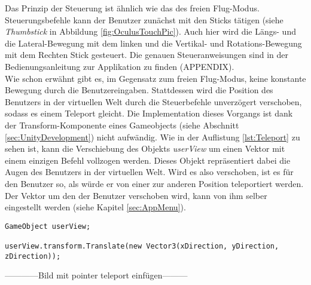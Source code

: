 Das Prinzip der Steuerung ist ähnlich wie das des freien Flug-Modus. Steuerungsbefehle kann der Benutzer zunächst mit den Sticks tätigen (siehe \textit{Thumbstick} in Abbildung \ref{fig:OculusTouchPic}). Auch hier wird die Längs- und die Lateral-Bewegung mit dem linken und die Vertikal- und Rotations-Bewegung mit dem Rechten Stick gesteuert. Die genauen Steueranweisungen sind in der Bedienungsanleitung zur Applikation zu finden (APPENDIX).\\

Wie schon erwähnt gibt es, im Gegensatz zum freien Flug-Modus, keine konstante Bewegung durch die Benutzereingaben. Stattdessen wird die Position des Benutzers in der virtuellen Welt durch die Steuerbefehle unverzögert verschoben, sodass es einem Teleport gleicht. Die Implementation dieses Vorgangs ist dank der Transform-Komponente eines Gameobjects (siehe Abschnitt \ref{sec:UnityDevelopment}) nicht aufwändig. Wie in der Auflistung \ref{lst:Teleport} zu sehen ist, kann die Verschiebung des Objekts \textit{userView} um einen Vektor mit einem einzigen Befehl vollzogen werden. Dieses Objekt repräsentiert dabei die Augen des Benutzers in der virtuellen Welt. Wird es also verschoben, ist es für den Benutzer so, als würde er von einer zur anderen Position teleportiert werden. Der Vektor um den der Benutzer verschoben wird, kann von ihm selber eingestellt werden (siehe Kapitel \ref{sec:AppMenu}).

\begin{lstlisting}[caption={Implementierung des Teleportationsbefehls}, captionpos=t, label=lst:Teleport]
GameObject userView;

userView.transform.Translate(new Vector3(xDirection, yDirection, zDirection));
\end{lstlisting}
\quad

------------Bild mit pointer teleport einfügen---------


